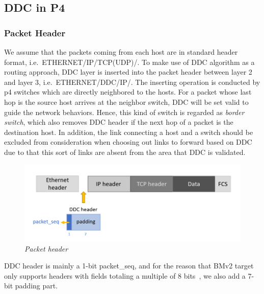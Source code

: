 \subsection{DDC in P4}
\label{sec:DDC}
\subsubsection{Packet Header}
We assume that the packets coming from each host are in standard header format, i.e.~ETHERNET/IP/TCP(UDP)/. 
To make use of DDC algorithm as a routing approach, DDC layer is inserted into the packet header between layer 2 and layer 3, i.e.~ETHERNET/DDC/IP/. 
The inserting operation is conducted by p4 switches which are directly neighbored to the hosts. 
For a packet whose last hop is the source host arrives at the neighbor switch, DDC will be set valid to guide the network behaviors. 
Hence, this kind of switch is regarded as \textit{border switch}, which also removes DDC header if the next hop of a packet is the destination host. 
In addition, the link connecting a host and a switch should be excluded from consideration when choosing out links to forward based on DDC due to that this sort of links are absent from the area that DDC is validated.

\begin{figure}[H]
      \centering \includegraphics[scale=0.55]{pictures/packet header.png}
      \caption{\it{Packet header}}
\end{figure}

DDC header is mainly a 1-bit packet\_seq, and for the reason that BMv2 target only supports headers with fields totaling a multiple of 8 bits~\cite{p4-spec}, we also add a 7-bit padding part.    

